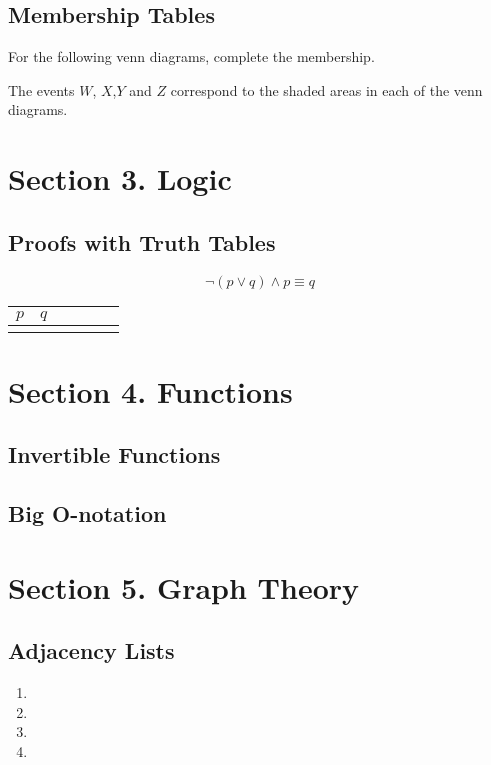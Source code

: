 \subsection*{Membership Tables}
For the following venn diagrams, complete the membership.

The events $W$, $X$,$Y$ and $Z$ correspond to the shaded areas in each of the venn diagrams.

\section*{Section 3. Logic}

\subsection*{Proofs with Truth Tables}

\[ \neg(p \vee q) \wedge p \equiv q \]
\begin{center}
\begin{tabular}{|c|c||c|c||c|c|}
\hline $p$ & $q$ &  &  &  &  \\ 
\hline  &  &  &  &  &  \\ 
\hline 
\end{tabular} 
\end{center}


\section*{Section 4. Functions}

\subsection*{Invertible Functions}

\subsection*{Big O-notation}



\section*{Section 5. Graph Theory}

\subsection*{Adjacency Lists}
\begin{enumerate}
\item
\item
\item
\item
\end{enumerate}



